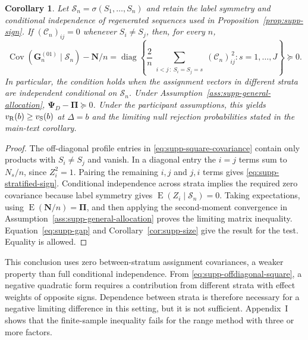 \documentclass[12pt,a4paper]{article}
\newtheorem{corollary}{Corollary}
\theoremstyle{definition}
\theoremstyle{remark}\newtheorem{remark}{Remark}
\numberwithin{equation}{section}
\newcommand{\E}{\operatorname{E}}
\newcommand{\Cov}{\operatorname{Cov}}
\newcommand{\diag}{\operatorname{diag}}
\begin{document}
\begin{corollary}\label{cor:supp-stratified-sign}
Let $\mathcal S_n=\sigma(S_1,\ldots,S_n)$ and retain the label symmetry and conditional independence of regenerated sequences used in Proposition~\ref{prop:supp-sign}. If $(\mathcal C_n)_{ij}=0$ whenever $S_i\ne S_j$, then, for every $n$,
\begin{equation}\label{eq:supp-stratified-sign}
 \Cov(\bm G_n^{(01)}\mid\mathcal S_n)-\bm N/n
 =\diag\left\{\frac2n\sum_{\substack{i<j\,:\ S_i=S_j=s}}
                  (\mathcal C_n)_{ij}^{\,2}:s=1,\ldots,J\right\}\succeq0.
\end{equation}
In particular, the condition holds when the assignment vectors in different strata are independent conditional on $\mathcal S_n$. Under Assumption~\ref{ass:supp-general-allocation}, $\bm\Psi_D-\bm\Pi\succeq0$. Under the participant assumptions, this yields $v_{\rm R}(b)\ge v_{\rm S}(b)$ at $\Delta=b$ and the limiting null rejection probabilities stated in the main-text corollary.
\end{corollary}
\begin{proof}
The off-diagonal profile entries in \eqref{eq:supp-square-covariance} contain only products with $S_i\ne S_j$ and vanish. In a diagonal entry the $i=j$ terms sum to $N_s/n$, since $Z_i^2=1$. Pairing the remaining $i,j$ and $j,i$ terms gives \eqref{eq:supp-stratified-sign}. Conditional independence across strata implies the required zero covariance because label symmetry gives $\E(Z_i\mid\mathcal S_n)=0$. Taking expectations, using $\E(\bm N/n)=\bm\Pi$, and then applying the second-moment convergence in Assumption~\ref{ass:supp-general-allocation} proves the limiting matrix inequality. Equation~\eqref{eq:supp-gap} and Corollary~\ref{cor:supp-size} give the result for the test. Equality is allowed.
\end{proof}
This conclusion uses zero between-stratum assignment covariances, a weaker property than full conditional independence. From \eqref{eq:supp-offdiagonal-square}, a negative quadratic form requires a contribution from different strata with effect weights of opposite signs. Dependence between strata is therefore necessary for a negative limiting difference in this setting, but it is not sufficient. Appendix~I shows that the finite-sample inequality fails for the range method with three or more factors.
\end{document}
